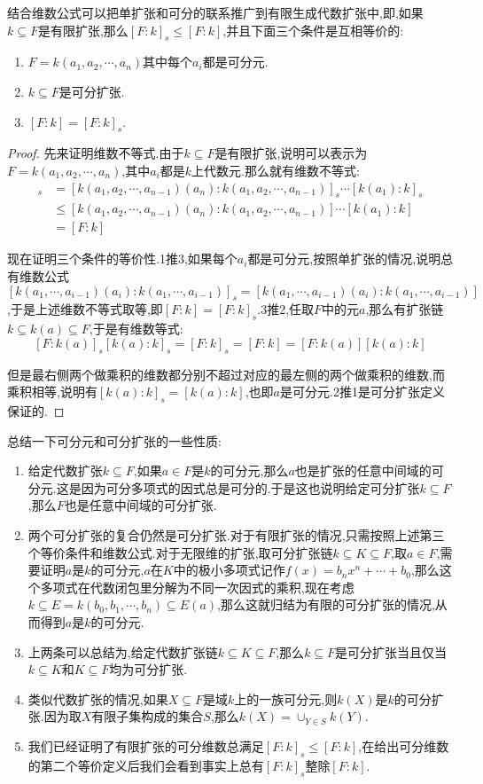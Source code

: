 结合维数公式可以把单扩张和可分的联系推广到有限生成代数扩张中,即,如果$k\subseteq F$是有限扩张,那么$[F:k]_s\le [F:k]$,并且下面三个条件是互相等价的:
\begin{enumerate}
	\item $F=k(a_1,a_2,\cdots,a_n)$其中每个$a_i$都是可分元.
	\item $k\subseteq F$是可分扩张.
	\item $[F:k]=[F:k]_s$.
\end{enumerate}
\begin{proof}
	
	先来证明维数不等式.由于$k\subseteq F$是有限扩张,说明可以表示为$F=k(a_1,a_2,\cdots,a_n)$,其中$a_i$都是$k$上代数元.那么就有维数不等式:
	\begin{align*}
	[F:k]_s&=[k(a_1,a_2,\cdots,a_{n-1})(a_n):k(a_1,a_2,\cdots,a_{n-1})]_s\cdots[k(a_1):k]_s\\
	&\le [k(a_1,a_2,\cdots,a_{n-1})(a_n):k(a_1,a_2,\cdots,a_{n-1})]\cdots[k(a_1):k]\\
	&=[F:k]
	\end{align*}
	
	现在证明三个条件的等价性.1推3,如果每个$a_i$都是可分元,按照单扩张的情况,说明总有维数公式$[k(a_1,\cdots,a_{i-1})(a_i):k(a_1,\cdots,a_{i-1})]_s=[k(a_1,\cdots,a_{i-1})(a_i):k(a_1,\cdots,a_{i-1})]$,于是上述维数不等式取等,即$[F:k]=[F:k]_s$.3推2,任取$F$中的元$a$,那么有扩张链$k\subseteq k(a)\subseteq F$,于是有维数等式:
	$$[F:k(a)]_s[k(a):k]_s=[F:k]_s=[F:k]=[F:k(a)][k(a):k]$$
	
	但是最右侧两个做乘积的维数都分别不超过对应的最左侧的两个做乘积的维数,而乘积相等,说明有$[k(a):k]_s=[k(a):k]$,也即$a$是可分元.2推1是可分扩张定义保证的.
\end{proof}

总结一下可分元和可分扩张的一些性质:
\begin{enumerate}
	\item 给定代数扩张$k\subseteq F$,如果$a\in F$是$k$的可分元,那么$a$也是扩张的任意中间域的可分元.这是因为可分多项式的因式总是可分的.于是这也说明给定可分扩张$k\subseteq F$,那么$F$也是任意中间域的可分扩张.
	\item 两个可分扩张的复合仍然是可分扩张.对于有限扩张的情况,只需按照上述第三个等价条件和维数公式.对于无限维的扩张,取可分扩张链$k\subseteq K\subseteq F$,取$a\in F$,需要证明$a$是$k$的可分元,$a$在$K$中的极小多项式记作$f(x)=b_nx^n+\cdots+b_0$,那么这个多项式在代数闭包里分解为不同一次因式的乘积,现在考虑$k\subseteq E=k(b_0,b_1,\cdots,b_n)\subseteq E(a)$,那么这就归结为有限的可分扩张的情况,从而得到$a$是$k$的可分元.
	\item 上两条可以总结为,给定代数扩张链$k\subseteq K\subseteq F$,那么$k\subseteq F$是可分扩张当且仅当$k\subseteq K$和$K\subseteq F$均为可分扩张.
	\item 类似代数扩张的情况,如果$X\subseteq F$是域$k$上的一族可分元,则$k(X)$是$k$的可分扩张.因为取$X$有限子集构成的集合$S$,那么$k(X)=\cup_{Y\in S}k(Y)$.
	\item 我们已经证明了有限扩张的可分维数总满足$[F:k]_s\le[F:k]$,在给出可分维数的第二个等价定义后我们会看到事实上总有$[F:k]_s$整除$[F:k]$.
\end{enumerate}

